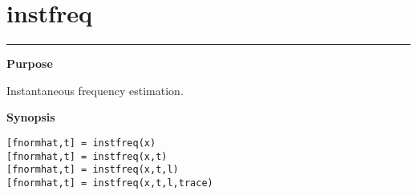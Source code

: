 


\section*{\hspace*{-1.6cm} instfreq}

\vspace*{-.4cm}
\hspace*{-1.6cm}\rule[0in]{16.5cm}{.02cm}
\vspace*{.2cm}



{\bf \large \sf Purpose}\\
\hspace*{1.5cm}
\begin{minipage}[t]{13.5cm}
Instantaneous frequency estimation.
\end{minipage}
\vspace*{.1cm}


{\bf \large \sf Synopsis}\\
\hspace*{1.5cm}
\begin{minipage}[t]{13.5cm}
\begin{verbatim}
[fnormhat,t] = instfreq(x)
[fnormhat,t] = instfreq(x,t)
[fnormhat,t] = instfreq(x,t,l)
[fnormhat,t] = instfreq(x,t,l,trace)
\end{verbatim}
\end{minipage}
\vspace*{.5cm}


